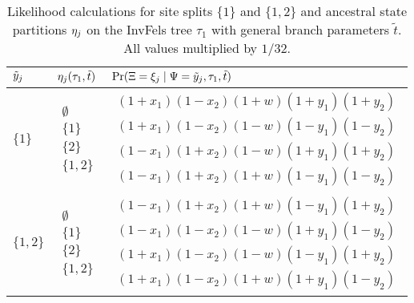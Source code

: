\begin{table}
\centering
\begin{tabular}{|l|ll|}
    \hline
    $\tilde{y}_j$    & $\eta_j(\tau_1, \tilde{t})$ & $\Pr(\Xi=\xi_j \mid \Psi=\tilde{y}_j,\tau_1,\tilde{t})$\\
    \hline
     $\{1\}$    &
    $\begin{array}{l}
                    \emptyset\\
                    \{1\}\\
                    \{2\}\\
                    \{1,2\}
                \end{array}$&
    $\begin{array}{l}
                    (1+x_1)(1-x_2)(1+w)(1+y_1)(1+y_2)\\
                    (1+x_1)(1-x_2)(1-w)(1-y_1)(1-y_2)\\
                    (1-x_1)(1+x_2)(1-w)(1+y_1)(1+y_2)\\
                    (1-x_1)(1+x_2)(1+w)(1-y_1)(1-y_2)
                \end{array}$\\
    \hline
     $\{1,2\}$    &
    $\begin{array}{l}
                    \emptyset\\
                    \{1\}\\
                    \{2\}\\
                    \{1,2\}
                \end{array}$&
    $\begin{array}{l}
                    (1-x_1)(1+x_2)(1+w)(1-y_1)(1+y_2)\\
                    (1-x_1)(1-x_2)(1-w)(1+y_1)(1-y_2)\\
                    (1+x_1)(1-x_2)(1-w)(1-y_1)(1+y_2)\\
                    (1+x_1)(1-x_2)(1+w)(1+y_1)(1-y_2)
                \end{array}$\\
    \hline
\end{tabular}
\caption{Likelihood calculations for site splits $\{1\}$ and $\{1,2\}$ and ancestral state partitions $\eta_j$ on the InvFels tree $\tau_1$ with general branch parameters $\tilde{t}$.
All values multiplied by $1/32$.}
\label{tab:edge-cases}
\end{table}

